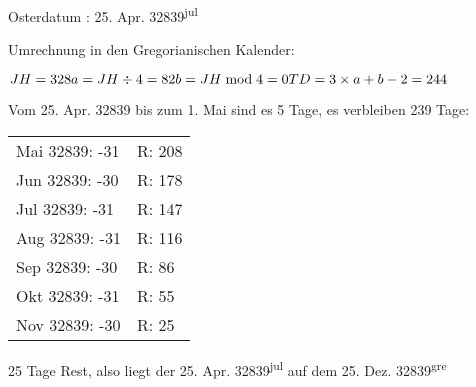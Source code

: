 			Osterdatum : 25. Apr. 32839\textsuperscript{jul}

			Umrechnung in den Gregorianischen Kalender:

			\begin{math}
			JH = 328						\\
			a = JH \div 4 = 82				\\
			b = JH \bmod 4 = 0				\\
			TD = 3 \times a + b - 2 = 244 	\\
			\end{math}

			Vom 25. Apr. 32839 bis zum 1. Mai sind es 5 Tage, es verbleiben 239 Tage:

			\begin{tabular}{ll}
				Mai 32839: -31 & R: 208 \\
				Jun 32839: -30 & R: 178 \\
				Jul 32839: -31 & R: 147 \\
				Aug 32839: -31 & R: 116 \\
				Sep 32839: -30 & R: 86  \\
				Okt 32839: -31 & R: 55  \\
				Nov 32839: -30 & R: 25 
			\end{tabular}

			25 Tage Rest, also liegt der 25. Apr. 32839\textsuperscript{jul} auf dem 25. Dez. 32839\textsuperscript{gre}